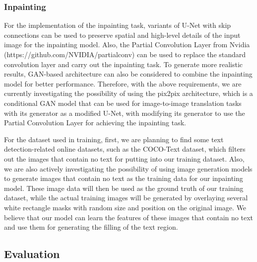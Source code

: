 \documentclass[10pt,twocolumn,letterpaper]{article}
\begin{document}

\subsubsection{Inpainting}


For the implementation of the inpainting task, variants of U-Net with skip connections can be used to preserve spatial and high-level 
details of the input image for the inpainting model. Also, the Partial Convolution Layer from Nvidia 
(https://github.com/NVIDIA/partialconv) can be used to replace the standard convolution layer and carry out the inpainting task. To 
generate more realistic results, GAN-based architecture can also be considered to combine the inpainting model for better performance.
Therefore, with the above requirements, we are currently investigating the possibility of using the pix2pix architecture,
which is a conditional GAN model that can be used for image-to-image translation tasks with its generator as a modified U-Net, 
with modifying its generator to use the Partial Convolution Layer for achieving the inpainting task.

For the dataset used in training, first, we are planning to find some text detection-related online datasets, 
such as the COCO-Text dataset, which filters out the images that contain no text for putting into our training dataset. 
Also, we are also actively investigating the possibility of using image generation models to generate images that contain 
no text as the training data for our inpainting model. These image data will then be used as the ground truth of our training dataset, 
while the actual training images will be generated by overlaying several white rectangle masks with random size and position on the original image. 
We believe that our model can learn the features of these images that contain no text and use them for generating the filling of the text region.

\subsection{Evaluation}

\end{document}
